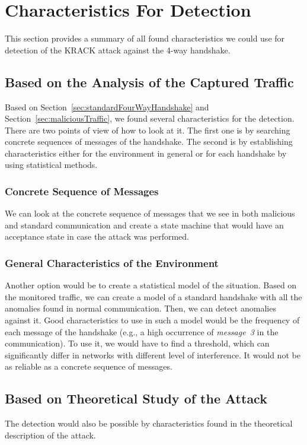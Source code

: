 \section{Characteristics For Detection}
This section provides a summary of all found characteristics we could use for detection of the KRACK attack against the 4-way handshake.

\subsection{Based on the Analysis of the Captured Traffic}
Based on Section~\ref{sec:standardFourWayHandshake} and Section~\ref{sec:maliciousTraffic}, we found several characteristics for the detection. There are two points of view of how to look at it. The first one is by searching concrete sequences of messages of the handshake. The second is by establishing characteristics either for the environment in general or for each handshake by using statistical methods.

\subsubsection*{Concrete Sequence of Messages}
We can look at the concrete sequence of messages that we see in both malicious and standard communication and create a state machine that would have an acceptance state in case the attack was performed.

\subsubsection*{General Characteristics of the Environment}
Another option would be to create a statistical model of the situation. Based on the monitored traffic, we can create a model of a standard handshake with all the anomalies found in normal communication. Then, we can detect anomalies against it. Good characteristics to use in such a model would be the frequency of each message of the handshake (e.g., a high occurrence of \textit{message~3} in the communication). To use it, we would have to find a threshold, which can significantly differ in networks with different level of interference. It would not be as reliable as a concrete sequence of messages.

\subsection{Based on Theoretical Study of the Attack}
The detection would also be possible by characteristics found in the theoretical description of the attack. 

